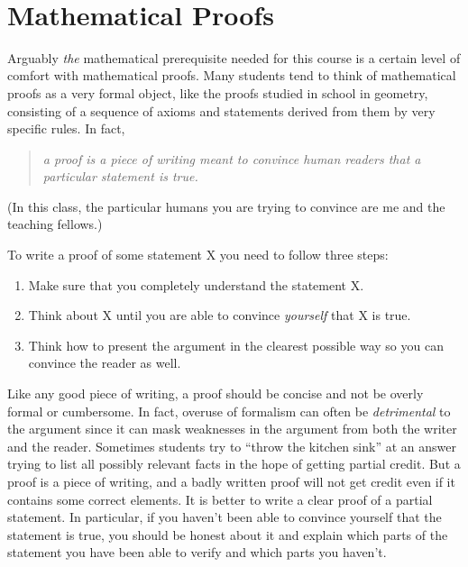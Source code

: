 ~

\section{Mathematical Proofs}\label{0-Mathematical-Proofs}

Arguably \emph{the} mathematical prerequisite needed for this course is
a certain level of comfort with mathematical proofs. Many students tend
to think of mathematical proofs as a very formal object, like the proofs
studied in school in geometry, consisting of a sequence of axioms and
statements derived from them by very specific rules. In fact,

\begin{quote}
\emph{a proof is a piece of writing meant to convince human readers that
a particular statement is true.}
\end{quote}

(In this class, the particular humans you are trying to convince are me
and the teaching fellows.)

To write a proof of some statement X you need to follow three steps:

\begin{enumerate}
\def\labelenumi{\arabic{enumi}.}
\item
  Make sure that you completely understand the statement X.
\item
  Think about X until you are able to convince \emph{yourself} that X is
  true.
\item
  Think how to present the argument in the clearest possible way so you
  can convince the reader as well.
\end{enumerate}

Like any good piece of writing, a proof should be concise and not be
overly formal or cumbersome. In fact, overuse of formalism can often be
\emph{detrimental} to the argument since it can mask weaknesses in the
argument from both the writer and the reader. Sometimes students try to
``throw the kitchen sink'' at an answer trying to list all possibly
relevant facts in the hope of getting partial credit. But a proof is a
piece of writing, and a badly written proof will not get credit even if
it contains some correct elements. It is better to write a clear proof
of a partial statement. In particular, if you haven't been able to
convince yourself that the statement is true, you should be honest about
it and explain which parts of the statement you have been able to verify
and which parts you haven't.

